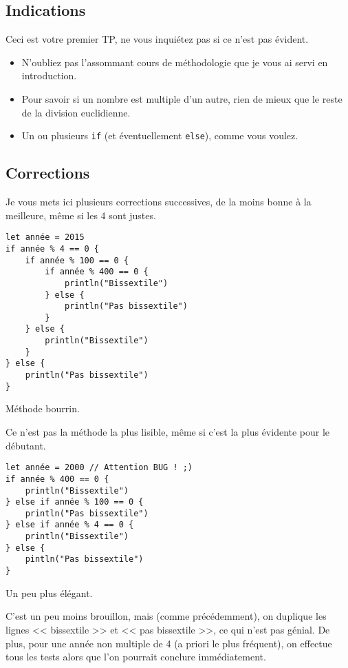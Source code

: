 \subsection{Indications}

Ceci est votre premier TP, ne vous inquiétez pas si ce n'est pas évident.

\begin{itemize}

\item N'oubliez pas l'assommant cours de méthodologie que je vous ai servi en introduction.

\item Pour savoir si un nombre est multiple d'un autre,
rien de mieux que le reste de la division euclidienne.

\item Un ou plusieurs \texttt{if} (et éventuellement \texttt{else}), comme vous voulez.
\end{itemize}
\pagebreak %
\subsection{Corrections}
Je vous mets ici plusieurs corrections successives,
de la moins bonne à la meilleure, même si les 4 sont justes.

\begin{listing}[h!]
\begin{verbatim}
let année = 2015
if année % 4 == 0 {
    if année % 100 == 0 {
        if année % 400 == 0 {
            println("Bissextile")
        } else {
            println("Pas bissextile")
        }
    } else {
        println("Bissextile")
    }
} else {
    println("Pas bissextile")
}
\end{verbatim}
\caption{Méthode bourrin.}
\end{listing}
Ce n'est pas la méthode la plus lisible,
même si c'est la plus évidente pour le débutant.

\begin{listing}[h!]
\begin{verbatim}
let année = 2000 // Attention BUG ! ;)
if année % 400 == 0 {
    println("Bissextile")
} else if année % 100 == 0 {
    println("Pas bissextile")
} else if année % 4 == 0 {
    println("Bissextile")
} else {
    pintln("Pas bissextile")
}
\end{verbatim}
\caption{Un peu plus élégant.}
\end{listing}
C'est un peu moins brouillon, mais (comme précédemment), on duplique les lignes << bissextile >> et << pas bissextile >>, ce qui n'est pas génial. De plus, pour une année non multiple de 4 (a priori le plus fréquent), on effectue tous les tests alors que l'on pourrait conclure immédiatement.


